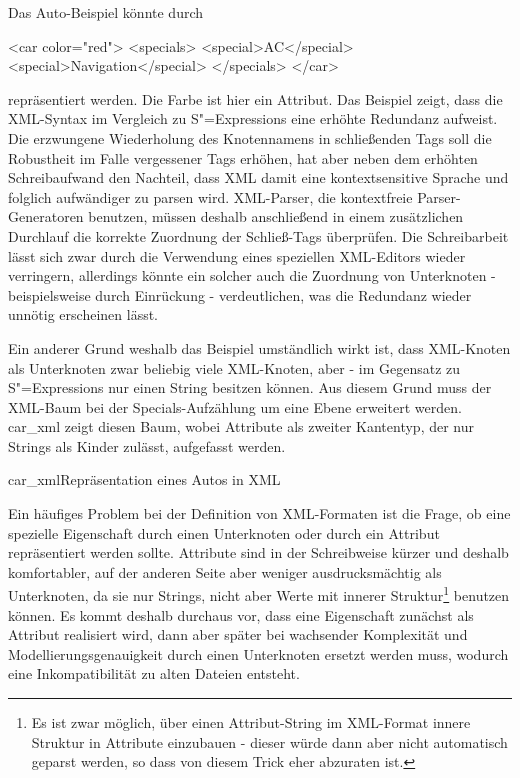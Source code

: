 \documentclass[11pt, a4paper, bibgerm]{book}
\newcommand\abb{}
\newcommand\fig{}
\newcommand{\sexps}{S"=Expressions}
\begin{document}
Das Auto-Beispiel könnte durch
\begin{code}
<car color="red">
  <specials>
    <special>AC</special>
    <special>Navigation</special>
  </specials>
</car>
\end{code} %
repräsentiert werden. Die Farbe ist hier ein Attribut. Das Beispiel
zeigt, dass die XML-Syntax im Vergleich zu \sexps{} eine erhöhte
Redundanz aufweist. Die erzwungene Wiederholung des Knotennamens in
schließenden Tags soll die Robustheit im Falle vergessener Tags erhöhen,
hat aber neben dem erhöhten Schreibaufwand den Nachteil, dass XML damit
eine kontextsensitive Sprache und folglich aufwändiger zu parsen
wird. XML-Parser, die kontextfreie Parser-Generatoren benutzen, müssen
deshalb anschließend in einem zusätzlichen Durchlauf die korrekte
Zuordnung der Schließ-Tags überprüfen. Die Schreibarbeit lässt sich zwar
durch die Verwendung eines speziellen XML-Editors wieder verringern,
allerdings könnte ein solcher auch die Zuordnung von Unterknoten -
beispielsweise durch Einrückung - verdeutlichen, was die Redundanz
wieder unnötig erscheinen lässt.

Ein anderer Grund weshalb das Beispiel umständlich wirkt ist, dass
XML-Knoten als Unterknoten zwar beliebig viele XML-Knoten, aber - im
Gegensatz zu \sexps{} nur einen String besitzen können. Aus diesem Grund
muss der XML-Baum bei der Specials-Aufzählung um eine Ebene erweitert
werden. \abb{car_xml} zeigt diesen Baum, wobei Attribute als zweiter
Kantentyp, der nur Strings als Kinder zulässt, aufgefasst werden.

\fig{car_xml}{Repräsentation eines Autos in XML}

Ein häufiges Problem bei der Definition von XML-Formaten ist die
Frage, ob eine spezielle Eigenschaft durch einen Unterknoten oder
durch ein Attribut repräsentiert werden sollte. Attribute sind in der
Schreibweise kürzer und deshalb komfortabler, auf der anderen Seite
aber weniger ausdrucksmächtig als Unterknoten, da sie nur Strings,
nicht aber Werte mit innerer Struktur\footnote{Es ist zwar möglich,
  über einen Attribut-String im XML-Format innere Struktur in
  Attribute einzubauen - dieser würde dann aber nicht automatisch
  geparst werden, so dass von diesem Trick eher abzuraten ist.}
benutzen können. Es kommt deshalb durchaus vor, dass eine Eigenschaft
zunächst als Attribut realisiert wird, dann aber später bei wachsender
Komplexität und Modellierungsgenauigkeit durch einen Unterknoten
ersetzt werden muss, wodurch eine Inkompatibilität zu alten Dateien
entsteht.
\end{document}
